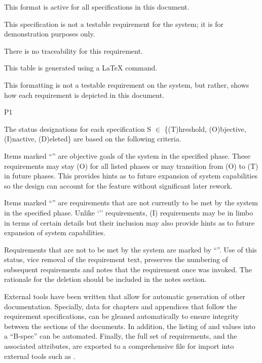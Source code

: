 {
	\item [All phases] This format is active for all specifications in this document.
}
{This specification is not a testable requirement for the system; it is for demonstration purposes only.}
{
	\item [N/A] There is no traceability for this requirement.
}
{
   \item This table is generated using a \LaTeX{} command.
   \item This formatting is not a testable requirement on the system, but rather, shows how each requirement is depicted in this document.
}
{P1}

The status designations for each specification S $\in$ \{(T)hreshold, (O)bjective, (I)nactive, (D)eleted\} are based on the following criteria.
\begin{my_description}
{
\item [\] Items marked ``\'' are driven by the project threshold needs that must be met in the specified phase.

\item [\OneRqmtObjective] Items marked ``\OneRqmtObjective'' are objective goals of the system in the specified phase. These requirements may stay (O) for all listed phases or may transition from (O) to (T) in future phases. This provides hints as to future expansion of system capabilities so the design can account for the feature without significant later rework.

\item [\OneRqmtInactive] Items marked ``\OneRqmtInactive'' are requirements that are not currently to be met by the system in the specified phase. Unlike `\OneRqmtObjective'' requirements, (I) requirements may be in limbo in terms of certain details but their inclusion may also provide hints as to future expansion of system capabilities. 

\item [\OneRqmtDeleted] Requirements that are not to be met by the system are marked by ``\OneRqmtDeleted''. Use of this status, vice removal of the requirement text, preserves the numbering of subsequent requirements and notes that the requirement once was invoked.
The rationale for the deletion should be included in the notes section. 
}
\end{my_description}

External tools have been written that allow for automatic generation of other documentation.
Specially, data for chapters and appendices that follow the requirement specifications, can be gleaned automatically to ensure integrity between the sections of the documents.
In addition, the listing of \KPP and \KSA values into a ``B-spec'' can be automated.
Finally, the full set of requirements, and the associated attributes, are exported to a comprehensive \CSV file for import into external tools such as \DOORS.



